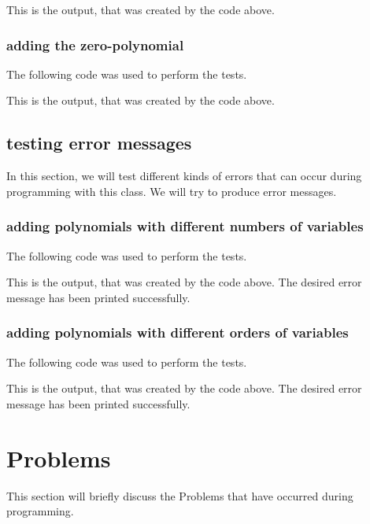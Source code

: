 \documentclass[11pt,titlepage]{article}
\begin{document}
		This is the output, that was created by the code above.
			
\newpage			
		\subsubsection{adding the zero-polynomial}
		The following code was used to perform the tests.
			
		
		This is the output, that was created by the code above.
			
			
\newpage		
	\subsection{testing error messages}
	In this section, we will test different kinds of errors that can occur during programming with this class.
	We will try to produce error messages.
	
		\subsubsection{adding polynomials with different numbers of variables}
		The following code was used to perform the tests.
			
		
		This is the output, that was created by the code above. The desired error message has been printed successfully.
			
			
		\subsubsection{adding polynomials with different orders of variables}
		The following code was used to perform the tests.
			
		
		This is the output, that was created by the code above. The desired error message has been printed successfully.
			
\newpage

		
	\section{Problems}
	This section will briefly discuss the Problems that have occurred during programming.
\newpage
		
\end{document}
